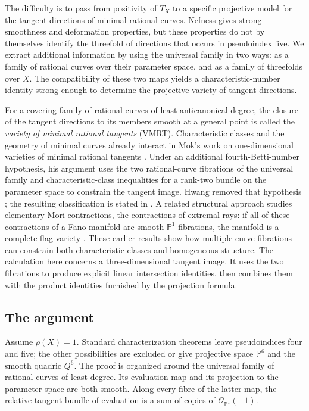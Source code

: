 The difficulty is to pass from positivity of $T_X$ to a specific
projective model for the tangent directions of minimal rational curves.
Nefness gives strong smoothness and deformation properties, but these
properties do not by themselves identify the threefold of directions
that occurs in pseudoindex five. We extract additional information by
using the universal family in two ways: as a family of rational curves
over their parameter space, and as a family of threefolds over $X$.
The compatibility of these two maps yields a characteristic-number
identity strong enough to determine the projective variety of tangent
directions.

For a covering family of rational curves of least anticanonical degree,
the closure of the tangent directions to its members smooth at a general
point is called the \emph{variety of minimal rational tangents} (VMRT).
Characteristic classes and the geometry of minimal curves already
interact in Mok's work on one-dimensional varieties of minimal rational
tangents \cite{Mok2002}. Under an additional fourth-Betti-number
hypothesis, his argument uses the two rational-curve fibrations of the
universal family and characteristic-class inequalities for a rank-two
bundle on the parameter space to constrain the tangent image.
Hwang removed that hypothesis
\cite[Section~4]{Hwang2006}; the resulting classification is stated in
\cite[Theorem~15]{Mok2008}. A related structural approach studies
elementary Mori contractions, the contractions of extremal rays:
if all of these contractions of a Fano manifold are smooth
$\mathbb P^1$-fibrations, the manifold is a complete flag variety
\cite[Theorem~1.2]{OcchettaSolaCondeWatanabeWisniewski2017}.
These earlier results show how multiple curve fibrations can constrain
both characteristic classes and homogeneous structure.
The calculation here concerns a three-dimensional tangent image. It
uses the two fibrations to produce explicit linear intersection
identities, then combines them with the product identities furnished
by the projection formula.

\subsection{The argument}

Assume $\rho(X)=1$. Standard characterization theorems
leave pseudoindices four and five; the other possibilities are excluded
or give projective space $\mathbb P^6$ and the smooth quadric $Q^6$.
The proof is organized around the universal family of rational curves
of least degree. Its evaluation map and its projection to the parameter
space are both smooth. Along every fibre of the latter map, the
relative tangent bundle of evaluation is a sum of copies of
$\mathcal O_{\mathbb P^1}(-1)$.

